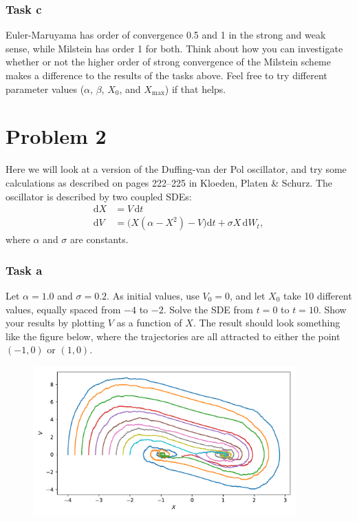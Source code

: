 \documentclass[a4paper]{article}
\begin{document}
\subsubsection*{Task c}
Euler-Maruyama has order of convergence 0.5 and 1 in the strong and weak sense, while Milstein has order 1 for both. Think about how you can investigate whether or not the higher order of strong convergence of the Milstein scheme makes a difference to the results of the tasks above. Feel free to try different parameter values ($\alpha$, $\beta$, $X_0$, and $X_\mathrm{max}$) if that helps.


\section*{Problem 2}

Here we will look at a version of the Duffing-van der Pol oscillator, and try some calculations as described on pages 222--225 in Kloeden, Platen \& Schurz. The oscillator is described by two coupled SDEs:
\begin{align}
    \label{eq:vdp}
\mathrm{d}X &= V\, \mathrm{d}t \\
\mathrm{d}V &= \big(X(\alpha-X^2) - V\big) \mathrm{d}t + \sigma X \, \mathrm{d}W_t,
\end{align}
where $\alpha$ and $\sigma$ are constants.


\subsubsection*{Task a}

Let $\alpha=1.0$ and $\sigma=0.2$. As initial values, use $V_0=0$, and let $X_0$ take 10 different values, equally spaced from $-4$ to $-2$. Solve the SDE from $t=0$ to $t=10$. Show your results by plotting $V$ as a function of $X$. The result should look something like the figure below, where the trajectories are all attracted to either the point $(-1, 0)$ or $(1, 0)$.

\begin{figure}[!!h]
    \centering
    \includegraphics[width=0.9\textwidth]{fig/exercise3_duffing_vdp.pdf}
\end{figure}
\end{document}
